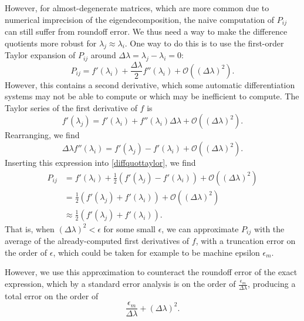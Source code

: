 \documentclass[../../main.tex]{subfiles}
\begin{document}
\begin{refsection}
	However, for almost-degenerate matrices, which are more common due to numerical imprecision of the eigendecomposition, the naive computation of $P_{ij}$ can still suffer from roundoff error.
	We thus need a way to make the difference quotients more robust for $\lambda_j \approx \lambda_i$.
	One way to do this is to use the first-order Taylor expansion of $P_{ij}$ around $\Delta \lambda = \lambda_j - \lambda_i = 0$:
	\begin{equation}\label{diffquottaylor}
		P_{ij} = f'(\lambda_i) + \frac{\Delta \lambda}{2} f''(\lambda_i) + \mathcal{O}((\Delta \lambda)^2).
	\end{equation}
	However, this contains a second derivative, which some automatic differentiation systems may not be able to compute or which may be inefficient to compute.
	The Taylor series of the first derivative of $f$ is
	$$f'(\lambda_j) = f'(\lambda_i) + f''(\lambda_i) \Delta \lambda + \mathcal{O}((\Delta \lambda)^2).$$
	Rearranging, we find
	$$\Delta\lambda f''(\lambda_i) = f'(\lambda_j) - f'(\lambda_i) + \mathcal{O}((\Delta \lambda)^2).$$
	Inserting this expression into \cref{diffquottaylor}, we find
	\begin{align}
		P_{ij} & = f'(\lambda_i) + \frac{1}{2} \left( f'(\lambda_j) - f'(\lambda_i) \right) +
		\mathcal{O}((\Delta \lambda)^2) \nonumber                                                         \\
		       & = \frac{1}{2} \left( f'(\lambda_j) + f'(\lambda_i) \right) +
		\mathcal{O}((\Delta \lambda)^2) \nonumber                                                         \\
		       & \approx \frac{1}{2} \left( f'(\lambda_j) + f'(\lambda_i) \right). \label{diffquotapprox}
	\end{align}
	That is, when $(\Delta\lambda)^2 < \epsilon$ for some small $\epsilon$, we can approximate $P_{ij}$ with the average of the already-computed first derivatives of $f$, with a truncation error on the order of $\epsilon$, which could be taken for example to be machine epsilon $\epsilon_m$.

	\clearpage
	However, we use this approximation to counteract the roundoff error of the exact expression, which by a standard error analysis is on the order of $\frac{\epsilon_m}{\Delta\lambda}$, producing a total error on the order of
	\begin{equation} \label{diffquotapproxerr}
		\frac{\epsilon_m}{\Delta\lambda} + (\Delta\lambda)^2.
	\end{equation}


\end{refsection}
\end{document}
